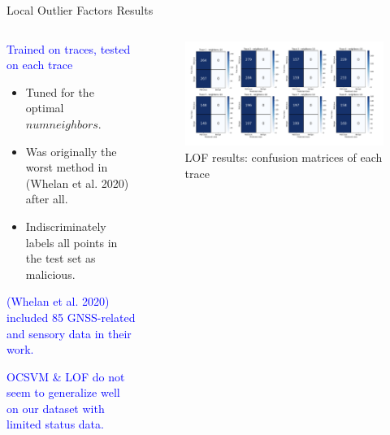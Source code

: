 \documentclass[aspectratio=169, 8pt]{beamer}
\begin{document}
\begin{frame}{Local Outlier Factors Results}

\begin{columns}

\begin{column}{0.4 \linewidth}
    \textcolor{blue}{\large{Trained on traces, tested on each trace}}
    \begin{itemize}
        \item Tuned for the optimal \(numneighbors\).

        \item Was originally the worst method in (Whelan et al. 2020) after all.

        \item Indiscriminately labels all points in the test set as malicious.

    \end{itemize}

    \vspace{5mm}
    
    \textcolor{blue}{(Whelan et al. 2020) included 85 GNSS-related and sensory data in their work.}

    \vspace{5mm}
    \textcolor{blue}{OCSVM \& LOF do not seem to generalize well on our dataset with limited status data. }
\end{column}


\begin{column}{0.7 \linewidth}
\begin{figure}
    \centering
    \includegraphics[width = 0.9 \linewidth]{images/lof-results.png}
    \caption{LOF results: confusion matrices of each trace}
    \label{fig:enter-label}
\end{figure}


\end{column}

\end{columns}

    
\end{frame}
\end{document}
